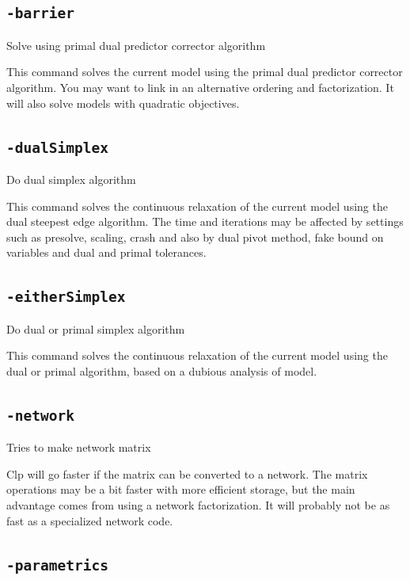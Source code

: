 \documentclass[11pt,a4paper]{article}
\begin{document}
\subsection*{\texttt{-barrier}}

Solve using primal dual predictor corrector algorithm

This command solves the current model using the  primal dual predictor corrector algorithm. You may want to link in an alternative ordering and factorization. It will also solve models with quadratic objectives.

\subsection*{\texttt{-dualSimplex}}

Do dual simplex algorithm

This command solves the continuous relaxation of the current model using the dual steepest edge algorithm. The time and iterations may be affected by settings such as presolve, scaling, crash and also by dual pivot method, fake bound on variables and dual and primal tolerances.

\subsection*{\texttt{-eitherSimplex}}

Do dual or primal simplex algorithm

This command solves the continuous relaxation of the current model using the dual or primal algorithm, based on a dubious analysis of model.

\subsection*{\texttt{-network}}

Tries to make network matrix

Clp will go faster if the matrix can be converted to a network.  The matrix operations may be a bit faster with more efficient storage, but the main advantage comes from using a network factorization. It will probably not be as fast as a specialized network code.

\subsection*{\texttt{-parametrics}}
\end{document}
